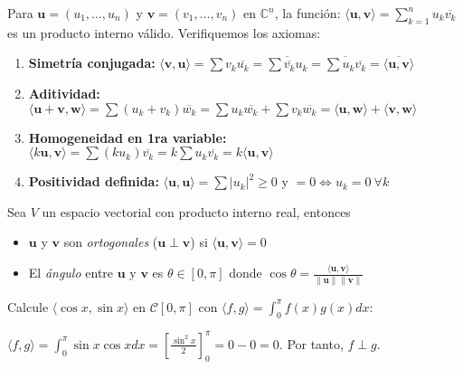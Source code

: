 \begin{example}
Para $\mathbf{u} = (u_1,\dots,u_n)$ y $\mathbf{v} = (v_1,\dots,v_n)$ en $\mathbb{C}^n$, la función: \(\langle \mathbf{u}, \mathbf{v} \rangle = \sum_{k=1}^n u_k \overline{v_k} \) es un producto interno válido. Verifiquemos los axiomas:
\begin{myproof}
\begin{enumerate}[$1.$]
    \item \textbf{Simetría conjugada:} 
    $\langle \mathbf{v}, \mathbf{u} \rangle = \sum v_k \overline{u_k} = \overline{\sum \overline{v_k} u_k} = \overline{\sum u_k \overline{v_k}} = \overline{\langle \mathbf{u}, \mathbf{v} \rangle}$
    
    \item \textbf{Aditividad:} 
    $\langle \mathbf{u} + \mathbf{v}, \mathbf{w} \rangle = \sum (u_k + v_k)\overline{w_k} = \sum u_k\overline{w_k} + \sum v_k\overline{w_k} = \langle \mathbf{u}, \mathbf{w} \rangle + \langle \mathbf{v}, \mathbf{w} \rangle$
    
    \item \textbf{Homogeneidad en 1ra variable:} 
    $\langle k\mathbf{u}, \mathbf{v} \rangle = \sum (ku_k)\overline{v_k} = k \sum u_k \overline{v_k} = k\langle \mathbf{u}, \mathbf{v} \rangle$
    
    \item \textbf{Positividad definida:} 
    $\langle \mathbf{u}, \mathbf{u} \rangle = \sum |u_k|^2 \geq 0$ y $=0 \iff u_k=0\ \forall k$
\end{enumerate}
\end{myproof}
\end{example}


\begin{definition}
Sea $V$ un espacio vectorial con producto interno real, entonces 
\begin{itemize}
    \item $\mathbf{u}$ y $\mathbf{v}$ son \textit{ortogonales} ($\mathbf{u} \perp \mathbf{v}$) si $\langle \mathbf{u}, \mathbf{v} \rangle = 0$
    \item El \textit{ángulo} entre $\mathbf{u}$ y $\mathbf{v}$ es $\theta \in [0, \pi]$ donde \(
    \cos \theta = \frac{\langle \mathbf{u}, \mathbf{v} \rangle}{\|\mathbf{u}\| \|\mathbf{v}\|}\)
\end{itemize}
\end{definition}

\begin{example} Calcule $\langle \cos x, \sin x \rangle$ en $\mathcal{C}[0, \pi]$ con $\langle f, g \rangle = \int_0^\pi f(x)g(x)  dx$:
\begin{myproof} \(
\langle f, g \rangle = \int_0^\pi \sin x \cos x  dx = \left[ \frac{\sin^2 x}{2} \right]_0^\pi = 0 - 0 = 0
.\) Por tanto, $f \perp g$.
\end{myproof}
\end{example}

